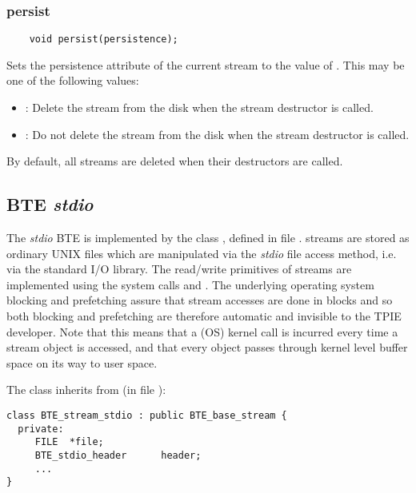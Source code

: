 \subsubsection{persist}
\begin{verbatim}
    void persist(persistence);
\end{verbatim}
Sets the persistence attribute of the current stream to the
value of . This may be one of the
following values:
\begin{itemize}
\item {}: Delete the stream from the
disk when the stream 
  destructor is called.
\item {}: Do not delete the stream from the disk when
  the stream destructor is called.
\end{itemize}

By default, all streams are deleted when their destructors
are called.

\subsection{BTE \emph{stdio}}

The \emph{stdio} BTE is implemented by the class
, defined in file
.  
streams are stored as ordinary UNIX files which are
manipulated via the \emph{stdio} file access method, i.e.
via the standard  I/O library. The read/write
primitives of  streams are
implemented using the system calls  and
. The underlying operating system blocking
and prefetching assure that stream accesses are done in
blocks and so both blocking and prefetching are therefore
automatic and invisible to the TPIE developer.  Note that
this means that a (OS) kernel call is incurred every time a
stream object is accessed, and that every object passes
through kernel level buffer space on its way to user space.

The  class inherits from
 (in file
):
\begin{verbatim}
class BTE_stream_stdio : public BTE_base_stream {
  private:
     FILE  *file;          
     BTE_stdio_header      header;
     ...
}  
\end{verbatim}

